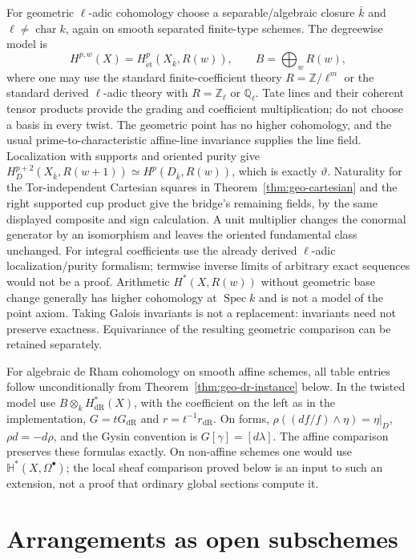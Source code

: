 \documentclass[11pt]{article}
\newcommand{\Z}{\mathbb Z}
\newcommand{\Spec}{\operatorname{Spec}}
\theoremstyle{definition}
\theoremstyle{remark}
\newcommand{\Q}{\mathbb Q}
\newcommand{\Om}{\Omega}
\newcommand{\dR}{\mathrm{dR}}
\newcommand{\HH}{\mathbb H}
\renewcommand{\Spec}{\ensuremath{\operatorname{Spec}}}
\begin{document}
For geometric \(\ell\)-adic cohomology choose a separable/algebraic closure $\bar k$ and $\ell\ne\operatorname{char}k$, again on smooth separated finite-type schemes. The degreewise model is
\[
 H^{p,w}(X)=H^p_{\mathrm{\acute et}}(X_{\bar k},R(w)),
 \qquad B=\bigoplus_w R(w),
\]
where one may use the standard finite-coefficient theory $R=\Z/\ell^m$ or the standard derived $\ell$-adic theory with $R=\Z_\ell$ or $\Q_\ell$. Tate lines and their coherent tensor products provide the grading and coefficient multiplication; do not choose a basis in every twist. The geometric point has no higher cohomology, and the usual prime-to-characteristic affine-line invariance supplies the line field. Localization with supports and oriented purity give
$H_D^{p+2}(X_{\bar k},R(w+1))\simeq H^p(D_{\bar k},R(w))$,
which is exactly $\vartheta$. Naturality for the Tor-independent Cartesian squares in Theorem~\ref{thm:geo-cartesian} and the right supported cup product give the bridge's remaining fields, by the same displayed composite and sign calculation. A unit multiplier changes the conormal generator by an isomorphism and leaves the oriented fundamental class unchanged. For integral coefficients use the already derived $\ell$-adic localization/purity formalism; termwise inverse limits of arbitrary exact sequences would not be a proof. Arithmetic $H^*(X,R(w))$ without geometric base change generally has higher cohomology at $\Spec k$ and is not a model of the point axiom. Taking Galois invariants is not a replacement: invariants need not preserve exactness. Equivariance of the resulting geometric comparison can be retained separately.

For algebraic de Rham cohomology on smooth affine schemes, all table entries follow unconditionally from Theorem~\ref{thm:geo-dr-instance} below. In the twisted model use $B\otimes_k H^*_{\dR}(X)$, with the coefficient on the left as in the implementation, $G=tG_{\dR}$ and $r=t^{-1}r_{\dR}$. On forms, $\rho((df/f)\wedge\eta)=\eta|_D$, $\rho d=-d\rho$, and the Gysin convention is $G[\gamma]=[d\lambda]$. The affine comparison preserves these formulas exactly. On non-affine schemes one would use $\HH^*(X,\Om^\bullet)$; the local sheaf comparison proved below is an input to such an extension, not a proof that ordinary global sections compute it.

\section{Arrangements as open subschemes}
\end{document}
